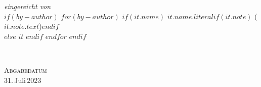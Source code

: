\begin{titlepage}
\begin{flushleft}
        \vspace{1.0cm}
        
        {\rmfamily\normalsize
            \textit{eingereicht von}\\
            $if(by-author)$
            $for(by-author)$
                $if(it.name)$
                    $it.name.literal$$if(it.note)$ ({$it.note.text$})$endif$\\ 
                $else$
                    $it$
                $endif$
            $endfor$
            $endif$         
        }

        
        
        \vfill
        

        {\rmfamily\footnotesize
            \textsc{\texplatesupervisortype}\\
            \texplatesupervisor

            \vspace{0.5cm}

            \textsc{Abgabedatum}\\
            {31.\,Juli\,2023} %
            

        }

    \end{flushleft}
\end{titlepage}
